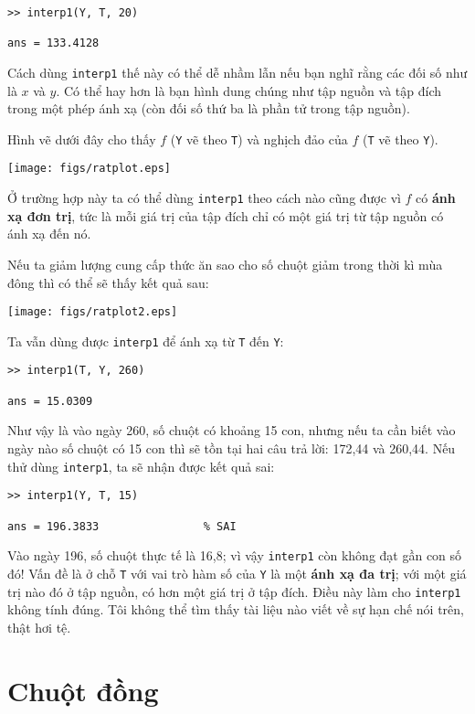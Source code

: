 \documentclass[12pt]{book}
\begin{document}
\begin{verbatim}
>> interp1(Y, T, 20)

ans = 133.4128
\end{verbatim}
%
Cách dùng {\tt interp1} thế này có thể dễ nhầm lẫn nếu bạn nghĩ rằng 
các đối số như là $x$ và $y$. Có thể hay hơn là bạn hình dung chúng 
như tập nguồn và tập đích trong một phép ánh xạ (còn đối số thứ ba 
là phần tử trong tập nguồn).

Hình vẽ dưới đây cho thấy $f$ ({\tt Y} vẽ theo  {\tt T}) và nghịch đảo 
của  $f$ ({\tt T} vẽ theo {\tt Y}).

\centerline{\texttt{[image: figs/ratplot.eps]}}

Ở trường hợp này ta có thể dùng  {\tt interp1} theo cách nào cũng được 
vì  $f$ có  {\bf ánh xạ đơn trị}, tức là mỗi giá trị của tập đích chỉ có một 
giá trị từ tập nguồn có ánh xạ đến nó.

Nếu ta giảm lượng cung cấp thức ăn sao cho số chuột giảm trong thời kì 
mùa đông thì có thể sẽ thấy kết quả sau:

\centerline{\texttt{[image: figs/ratplot2.eps]}}

Ta vẫn dùng được  {\tt interp1} để ánh xạ từ  {\tt T} đến  {\tt Y}:

\begin{verbatim}
>> interp1(T, Y, 260)

ans = 15.0309
\end{verbatim}
%
Như vậy là vào ngày 260, số chuột có khoảng 15 con, nhưng nếu ta cần biết 
vào ngày nào số chuột có 15 con thì sẽ tồn tại hai câu trả lời: 172,44 và 
260,44.  Nếu thử dùng  {\tt interp1}, ta sẽ nhận được kết quả sai:

\begin{verbatim}
>> interp1(Y, T, 15)         

ans = 196.3833                % SAI 
\end{verbatim}
%
Vào ngày 196, số chuột thực tế là 16,8; vì vậy  {\tt interp1} còn không đạt 
gần con số đó! Vấn đề là ở chỗ {\tt T} với vai trò hàm số của {\tt Y} là một 
{\bf ánh xạ đa trị}; với một giá trị nào đó ở tập nguồn, có hơn một giá trị ở 
tập đích. Điều này làm cho {\tt interp1} không tính đúng. Tôi không thể tìm thấy 
tài liệu nào viết về sự hạn chế nói trên, thật hơi tệ.


\section{Chuột đồng}
\end{document}
